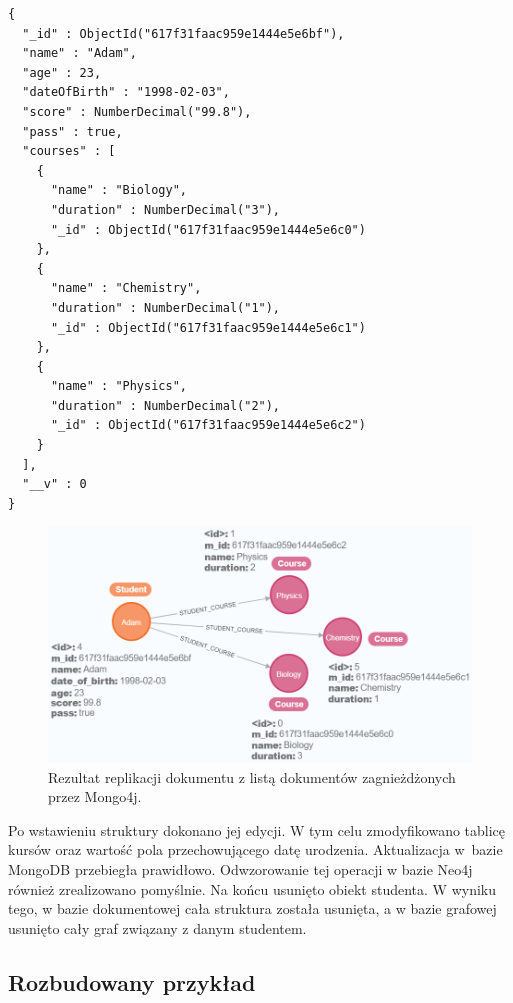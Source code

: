 \documentclass[a4paper,twoside,12pt]{book}
\begin{document}
\vspace{0.5cm}

\begin{lstlisting}[style=JSON, caption={Struktura dokumentu z listą dokumentów zagnieżdżonych wstawiona do bazy dokumentowej przez Mongo4j.}, label={listing:dokument-lista-obiektów-mongo4j}, captionpos=b]
{
  "_id" : ObjectId("617f31faac959e1444e5e6bf"),
  "name" : "Adam",
  "age" : 23,
  "dateOfBirth" : "1998-02-03",
  "score" : NumberDecimal("99.8"),
  "pass" : true,
  "courses" : [ 
    {
      "name" : "Biology",
      "duration" : NumberDecimal("3"),
      "_id" : ObjectId("617f31faac959e1444e5e6c0")
    }, 
    {
      "name" : "Chemistry",
      "duration" : NumberDecimal("1"),
      "_id" : ObjectId("617f31faac959e1444e5e6c1")
    }, 
    {
      "name" : "Physics",
      "duration" : NumberDecimal("2"),
      "_id" : ObjectId("617f31faac959e1444e5e6c2")
    }
  ],
  "__v" : 0
}
\end{lstlisting}

\begin{figure}
\centering
\includegraphics[width=12cm]{images/lista_obiektów_mongo4j.png}
\caption{Rezultat replikacji dokumentu z listą dokumentów zagnieżdżonych przez Mongo4j.}
\label{fig:graf-lista-obiektów-mongo4j}
\end{figure}

Po wstawieniu struktury dokonano jej edycji. W tym celu zmodyfikowano tablicę kursów oraz wartość pola przechowującego datę urodzenia. Aktualizacja w~bazie MongoDB przebiegła prawidłowo. Odwzorowanie tej operacji w bazie Neo4j również zrealizowano pomyślnie. Na końcu usunięto obiekt studenta. W wyniku tego, w bazie dokumentowej cała struktura została usunięta, a w bazie grafowej usunięto cały graf związany z danym studentem.

\subsection{Rozbudowany przykład}
\label{section:rozbudowany-przykład}
\end{document}
